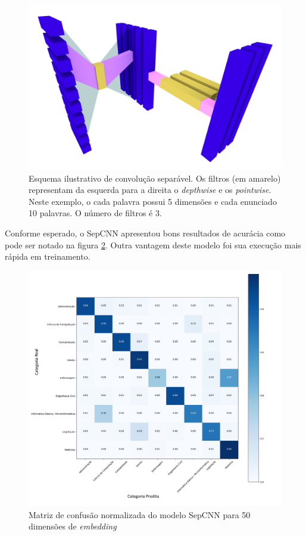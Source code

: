 \begin{figure}[!ht]
	\centering
	\includegraphics[width=\textwidth]{figures/sepcnn.png}
	\caption{Esquema ilustrativo de convolução separável. Os filtros (em amarelo) representam da esquerda para a direita o \textit{depthwise} e os \textit{pointwise}. Neste exemplo, o cada palavra possui 5 dimensões e cada enunciado 10 palavras. O número de filtros é 3.}
	\label{fig:sepcnn_detail}
\end{figure}

Conforme esperado, o SepCNN apresentou bons resultados de acurácia como pode ser notado na figura \ref{fig:sepcnn_confusion}. Outra vantagem deste modelo foi sua execução mais rápida em treinamento.

\begin{figure}[!ht]
	\centering
	\includegraphics[width=1.1\textwidth]{figures/sepcnn_confusion.png}
	\caption{Matriz de confusão normalizada do modelo SepCNN para 50 dimensões de \textit{embedding}}
	\label{fig:sepcnn_confusion}
\end{figure}

